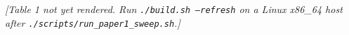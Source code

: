 \textit{[Table 1 not yet rendered. Run \texttt{./build.sh --refresh}
on a Linux x86\_64 host after \texttt{./scripts/run\_paper1\_sweep.sh}.]}
